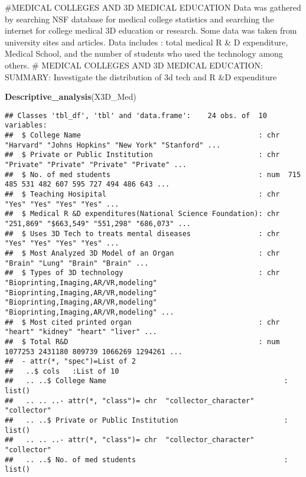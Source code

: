 \documentclass[]{article}
\newenvironment{Shaded}{\begin{snugshade}}{\end{snugshade}}
\newcommand{\KeywordTok}[1]{\textcolor[rgb]{0.13,0.29,0.53}{\textbf{#1}}}
\newcommand{\NormalTok}[1]{#1}
\begin{document}
\#MEDICAL COLLEGES AND 3D MEDICAL EDUCATION Data was gathered by
searching NSF database for medical college statistics and searching the
internet for college medical 3D education or research. Some data was
taken from university sites and articles. Data includes : total medical
R \& D expenditure, Medical School, and the number of students who used
the technology among others. \# MEDICAL COLLEGES AND 3D MEDICAL
EDUCATION: SUMMARY: Investigate the distribution of 3d tech and R \&D
expenditure

\begin{Shaded}
\begin{Highlighting}[]
\KeywordTok{Descriptive_analysis}\NormalTok{(X3D_Med)}
\end{Highlighting}
\end{Shaded}

\begin{verbatim}
## Classes 'tbl_df', 'tbl' and 'data.frame':    24 obs. of  10 variables:
##  $ College Name                                          : chr  "Harvard" "Johns Hopkins" "New York" "Stanford" ...
##  $ Private or Public Institution                         : chr  "Private" "Private" "Private" "Private" ...
##  $ No. of med students                                   : num  715 485 531 482 607 595 727 494 486 643 ...
##  $ Teaching Hosipital                                    : chr  "Yes" "Yes" "Yes" "Yes" ...
##  $ Medical R &D expenditures(National Science Foundation): chr  "251,869" "$663,549" "551,298" "686,073" ...
##  $ Uses 3D Tech to treats mental diseases                : chr  "Yes" "Yes" "Yes" "Yes" ...
##  $ Most Analyzed 3D Model of an Organ                    : chr  "Brain" "Lung" "Brain" "Brain" ...
##  $ Types of 3D technology                                : chr  "Bioprinting,Imaging,AR/VR,modeling" "Bioprinting,Imaging,AR/VR,modeling" "Bioprinting,Imaging,AR/VR,modeling" "Bioprinting,Imaging,AR/VR,modeling" ...
##  $ Most cited printed organ                              : chr  "heart" "kidney" "heart" "liver" ...
##  $ Total R&D                                             : num  1077253 2431180 809739 1066269 1294261 ...
##  - attr(*, "spec")=List of 2
##   ..$ cols   :List of 10
##   .. ..$ College Name                                          : list()
##   .. .. ..- attr(*, "class")= chr  "collector_character" "collector"
##   .. ..$ Private or Public Institution                         : list()
##   .. .. ..- attr(*, "class")= chr  "collector_character" "collector"
##   .. ..$ No. of med students                                   : list()

\end{verbatim}
\end{document}

